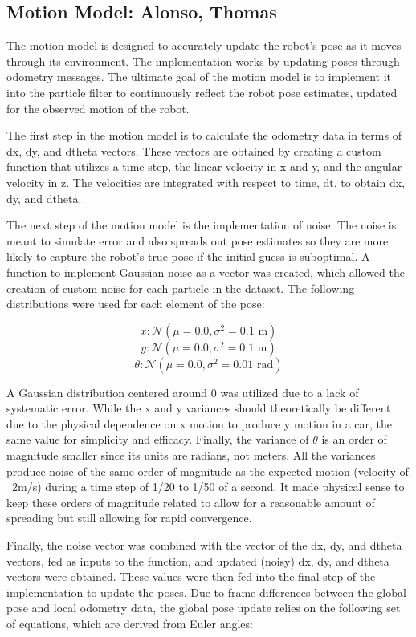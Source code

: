 \documentclass{article}
\begin{document}
\subsection{Motion Model: Alonso, Thomas}

The motion model is designed to accurately update the robot's pose as it moves through its environment. The implementation works by updating poses through odometry messages. The ultimate goal of the motion model is to implement it into the particle filter to continuously reflect the robot pose estimates, updated for the observed motion of the robot.  

The first step in the motion model is to calculate the odometry data in terms of dx, dy, and dtheta vectors. These vectors are obtained by creating a custom function that utilizes a time step, the linear velocity in x and y, and the angular velocity in z. The velocities are integrated with respect to time, dt, to obtain dx, dy, and dtheta. 

The next step of the motion model is the implementation of noise. The noise is meant to simulate error and also spreads out pose estimates so they are more likely to capture the robot's true pose if the initial guess is suboptimal. A function to implement Gaussian noise as a vector was created, which allowed the creation of custom noise for each particle in the dataset. The following distributions were used for each element of the pose:

\[
x: \mathcal{N}(\mu = 0.0, \sigma^2 = 0.1 \text{ m})
\]
\[
y: \mathcal{N}(\mu = 0.0, \sigma^2 = 0.1 \text{ m})
\]
\[
\theta: \mathcal{N}(\mu = 0.0, \sigma^2 = 0.01 \text{ rad})
\]

A Gaussian distribution centered around 0 was utilized due to a lack of systematic error. While the x and y variances should theoretically be different due to the physical dependence on x motion to produce y motion in a car, the same value for simplicity and efficacy. Finally, the variance of $\theta$ is an order of magnitude smaller since its units are radians, not meters. All the variances produce noise of the same order of magnitude as the expected motion (velocity of ~2m/s) during a time step of 1/20 to 1/50 of a second. It made physical sense to keep these orders of magnitude related to allow for a reasonable amount of spreading but still allowing for rapid convergence.

Finally, the noise vector was combined with the vector of the dx, dy, and dtheta vectors, fed as inputs to the function, and updated (noisy) dx, dy, and dtheta vectors were obtained. These values were then fed into the final step of the implementation to update the poses. Due to frame differences between the global pose and local odometry data, the global pose update relies on the following set of equations, which are derived from Euler angles:
\end{document}
